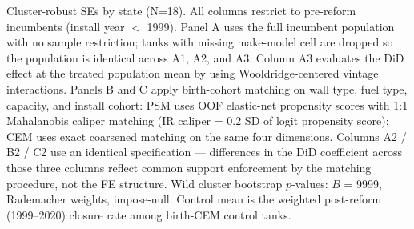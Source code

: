 \par \raggedright 
Cluster-robust SEs by state (N=18). All columns restrict to pre-reform incumbents (install year $<$ 1999). Panel A uses the full incumbent population with no sample restriction; tanks with missing make-model cell are dropped so the population is identical across A1, A2, and A3. Column A3 evaluates the DiD effect at the treated population mean by using Wooldridge-centered vintage interactions. Panels B and C apply birth-cohort matching on wall type, fuel type, capacity, and install cohort: PSM uses OOF elastic-net propensity scores with 1:1 Mahalanobis caliper matching (IR caliper = 0.2 SD of logit propensity score); CEM uses exact coarsened matching on the same four dimensions. Columns A2 / B2 / C2 use an identical specification --- differences in the DiD coefficient across those three columns reflect common support enforcement by the matching procedure, not the FE structure. Wild cluster bootstrap $p$-values: $B$ = 9999, Rademacher weights, impose-null. Control mean is the weighted post-reform (1999--2020) closure rate among birth-CEM control tanks.
\par\endgroup


